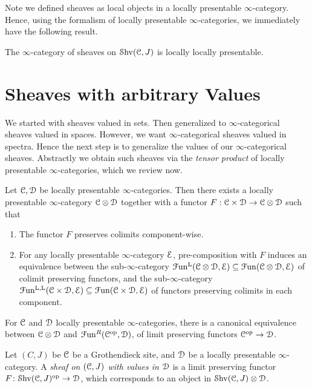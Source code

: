 \documentclass[10pt]{amsart}
\begin{document}
	Note we defined sheaves as local objects in a locally presentable $\infty$-category. Hence, using the formalism of locally presentable $\infty$-categories, we immediately have the following result. 
	
	\begin{proposition}
		The $\infty$-category of sheaves on $\mathcal{S}\mathrm{hv}(\mathcal{C},J)$ is locally locally presentable.
	\end{proposition}
	
\section{Sheaves with arbitrary Values}
We started with sheaves valued in sets. Then generalized to $\infty$-categorical sheaves valued in spaces. However, we want $\infty$-categorical sheaves valued in spectra. Hence the next step is to generalize the values of our $\infty$-categorical sheaves. Abstractly we obtain such sheaves via the \emph{tensor product} of locally presentable $\infty$-categories, which we review now.

\begin{theorem}
  Let $\mathcal{C}, \mathcal{D}$ be locally presentable $\infty$-categories. Then there exists a locally presentable $\infty$-category $\mathcal{C} \otimes \mathcal{D}$ together with a functor $F:\mathcal{C}\times\mathcal{D}\rightarrow\mathcal{C}\otimes\mathcal{D}$ such that 
  \begin{enumerate}
	\item The functor $F$ preserves colimits component-wise.
	\item For any locally presentable $\infty$-category $\mathcal{E}$, pre-composition with $F$ induces an equivalence between the sub-$\infty$-category $\mathcal{F}\mathrm{un}^{\mathrm{L}}(\mathcal{C} \otimes \mathcal{D} , \mathcal{E})\subseteq\mathcal{F}\mathrm{un}(\mathcal{C} \otimes \mathcal{D} , \mathcal{E})$ of colimit preserving functors, and the sub-$\infty$-category $\mathcal{F}\mathrm{un}^{\mathrm{L},\mathrm{L}}(\mathcal{C} \times \mathcal{D}, \mathcal{E})\subseteq\mathcal{F}\mathrm{un}(\mathcal{C}\times\mathcal{D},\mathcal{E})$ of functors preserving colimits in each component. 
  \end{enumerate}
\end{theorem}
\begin{theorem}For $\mathcal{C}$ and $\mathcal{D}$ locally presentable $\infty$-categories, there is a canonical equivalence between $\mathcal{C}\otimes\mathcal{D}$ and $\mathcal{F}\mathrm{un}^R(\mathcal{C}^{\mathrm{op}},\mathcal{D})$, of limit preserving functors $\mathcal{C}^{\mathrm{op}}\to\mathcal{D}$. 
\end{theorem}
\begin{definition}
  Let $(C,J)$ be $\mathcal{C}$ be a Grothendieck site, and $\mathcal{D}$ be a locally presentable $\infty$-category. A \emph{sheaf on $(\mathcal{C},J)$ with values in $\mathcal{D}$} is a limit preserving functor $F\colon \mathcal{S}\mathrm{hv}(\mathcal{C},J)^{\mathrm{op}} \to \mathcal{D}$, which corresponds to an object in $\mathcal{S}\mathrm{hv}(\mathcal{C},J) \otimes \mathcal{D}$. 
\end{definition}
\end{document}
